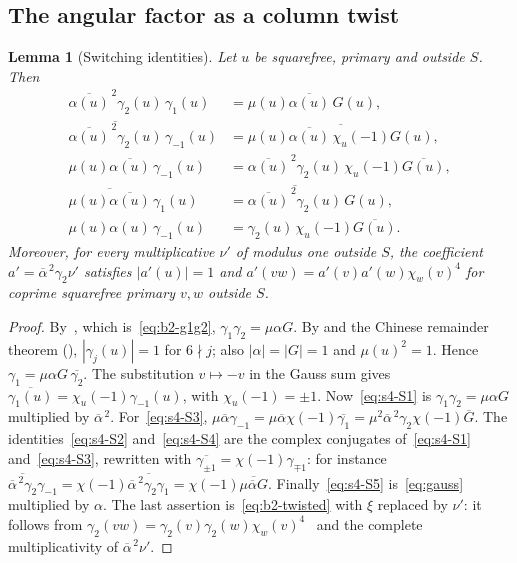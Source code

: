 \documentclass[11pt]{article}
\numberwithin{equation}{section}
\newtheorem{lemma}{Lemma}
\begin{document}
\subsection{The angular factor as a column twist}\label{sec:s4-twist}

\begin{lemma}[Switching identities]\label{lem:s4-switch}
Let $u$ be squarefree, primary and outside $S$. Then
\begin{align}
 \overline{\alpha(u)}^{\,2}\gamma_2(u)\,\gamma_1(u)&=\mu(u)\overline{\alpha(u)}\,G(u),\label{eq:s4-S1}\\
 \overline{\overline{\alpha(u)}^{\,2}\gamma_2(u)}\,\gamma_{-1}(u)
   &=\overline{\mu(u)\overline{\alpha(u)}\,\chi_u(-1)G(u)},\label{eq:s4-S2}\\
 \mu(u)\overline{\alpha(u)}\,\gamma_{-1}(u)&=\overline{\alpha(u)}^{\,2}\gamma_2(u)\,\chi_u(-1)\overline{G(u)},
   \label{eq:s4-S3}\\
 \overline{\mu(u)\overline{\alpha(u)}}\,\gamma_1(u)&=\overline{\overline{\alpha(u)}^{\,2}\gamma_2(u)}\,G(u),
   \label{eq:s4-S4}\\
 \mu(u)\alpha(u)\,\gamma_{-1}(u)&=\gamma_2(u)\,\chi_u(-1)\overline{G(u)}.\label{eq:s4-S5}
\end{align}
Moreover, for every multiplicative $\nu'$ of modulus one outside $S$, the coefficient
$a'=\overline\alpha^{\,2}\gamma_2\nu'$ satisfies $|a'(u)|=1$ and $a'(vw)=a'(v)a'(w)\chi_w(v)^4$ for coprime
squarefree primary $v,w$ outside $S$.
\end{lemma}

\begin{proof}
By~\cite[eq.~(4.7)]{OAI78}, which is~\eqref{eq:b2-g1g2}, $\gamma_1\gamma_2=\mu\alpha G$. By
\cite[Lemma~4.2]{OAI78} and the Chinese remainder theorem (\cite[proof of Lemma~4.4]{OAI78}),
$|\gamma_j(u)|=1$ for $6\nmid j$; also $|\alpha|=|G|=1$ and $\mu(u)^2=1$. Hence
$\gamma_1=\mu\alpha G\,\overline{\gamma_2}$. The substitution $v\mapsto-v$ in the Gauss sum gives
$\overline{\gamma_1(u)}=\chi_u(-1)\gamma_{-1}(u)$, with $\chi_u(-1)=\pm1$. Now~\eqref{eq:s4-S1} is $\gamma_1\gamma_2=\mu\alpha G$
multiplied by $\overline\alpha^{\,2}$. For~\eqref{eq:s4-S3},
$\mu\overline\alpha\gamma_{-1}=\mu\overline\alpha\chi(-1)\overline{\gamma_1}
=\mu^2\overline\alpha^{\,2}\gamma_2\chi(-1)\overline G$. The identities~\eqref{eq:s4-S2} and~\eqref{eq:s4-S4} are
the complex conjugates of~\eqref{eq:s4-S1} and~\eqref{eq:s4-S3}, rewritten with
$\overline{\gamma_{\pm1}}=\chi(-1)\gamma_{\mp1}$: for instance
$\overline{\overline\alpha^{\,2}\gamma_2}\gamma_{-1}=\chi(-1)\overline{\overline\alpha^{\,2}\gamma_2\gamma_1}
=\chi(-1)\overline{\mu\overline\alpha G}$. Finally~\eqref{eq:s4-S5} is~\eqref{eq:gauss} multiplied by $\alpha$.
The last assertion is~\eqref{eq:b2-twisted} with $\xi$ replaced by $\nu'$: it follows from
$\gamma_2(vw)=\gamma_2(v)\gamma_2(w)\chi_w(v)^4$~\cite[proof of Lemma~17.2, \emph{The first Poisson transformation}]{OAI78} and the complete multiplicativity of
$\overline\alpha^{\,2}\nu'$.
\end{proof}
\end{document}
